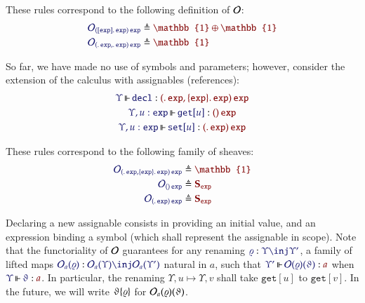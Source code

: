 \documentclass[11pt]{article}
\theoremstyle{definition}
\theoremstyle{remark}
\numberwithin{equation}{section}
\newcommand\SortExp{\mathtt{exp}}
\begin{document}
These rules correspond to the following definition of $\mathcal{O}$:
\begin{align*}
  \ADefine{
    \Operators_{
       \MkArity{
        \MkValence{}{\SortExp}{\SortExp}
      }{\SortExp}
    }
  }{
    \mathbb{1}\oplus\mathbb{1}
  }
  \\
  \ADefine{
    \Operators_{
      \MkArity{
        \MkValence{}{}{\SortExp},
        \MkValence{}{}{\SortExp}
      }{\SortExp}
    }
  }{
    \mathbb{1}
  }
\end{align*}

So far, we have made no use of symbols and parameters; however, consider the
extension of the calculus with assignables (references):
%
\begin{gather*}
  \IsOperator{\Upsilon}{\mathtt{decl}}{
    \MkArity{
      \MkValence{}{}{\SortExp},
      \MkValence{\SortExp}{}{\SortExp}
    }{
      \SortExp
    }
  }
\\
  \IsOperator{\Upsilon,u:\SortExp}{\mathtt{get}[u]}{
    \MkArity{}{\SortExp}
  }
\\
  \IsOperator{\Upsilon,u:\SortExp}{\mathtt{set}[u]}{
    \MkArity{
      \MkValence{}{}{\SortExp}
    }{
      \SortExp
    }
  }
\end{gather*}

These rules correspond to the following family of sheaves:
\begin{align*}
  \ADefine{
    \Operators_{
      \MkArity{
        \MkValence{}{}{\SortExp},
        \MkValence{\SortExp}{}{\SortExp}
      }{
        \SortExp
      }
    }
  }{
    \mathbb{1}
  }\\
  \ADefine{
    \Operators_{
      \MkArity{}{\SortExp}
    }
  }{
    \mathbf{S}_\SortExp
  }\\
  \ADefine{
    \Operators_{
      \MkArity{
        \MkValence{}{}{\SortExp}
      }{
        \SortExp
      }
    }
  }{
    \mathbf{S}_\SortExp
  }
\end{align*}

Declaring a new assignable consists in providing an initial value, and an
expression binding a symbol (which shall represent the assignable in scope).
Note that the functoriality of $\mathcal{O}$ guarantees for any renaming
$\Of{\varrho}{\Upsilon\inj\Upsilon'}$, a family of lifted maps
$\Of{\Operators_a(\varrho)}{\Operators_a(\Upsilon)\inj\Operators_a(\Upsilon')}$
natural in $a$, such that
$\IsOperator{\Upsilon'}{\Operators(\varrho)(\vartheta)}{a}$ when
$\IsOperator{\Upsilon}{\vartheta}{a}$. In particular, the renaming
$\Upsilon,u\mapsto\Upsilon,v$ shall take $\mathtt{get}[u]$ to
$\mathtt{get}[v]$. In the future, we will write $\vartheta\{\varrho\}$
for $\mathcal{O}_a(\varrho)(\vartheta)$.
\end{document}
